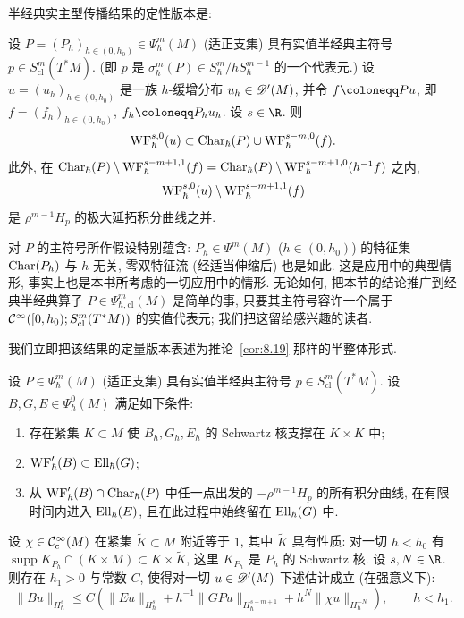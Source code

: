 半经典实主型传播结果的定性版本是:

\begin{theorem}[半经典波前集的传播]\label{thm:8.25}
设 $P = (P_h)_{h \in (0, h_0)} \in \Psi_\hbar^m(M)$ (适正支集) 具有实值半经典主符号 $p \in S_{\mathrm{cl}}^m(T^*M)$. (即 $p$ 是 $\sigma_\hbar^m(P) \in S_\hbar^m/hS_\hbar^{m-1}$ 的一个代表元.) 设 $u = (u_h)_{h \in (0, h_0)}$ 是一族 $h$-缓增分布 $u_h \in \mathscr{D}'(M)$, 并令 $f \defeq Pu$, 即 $f = (f_h)_{h \in (0, h_0)}$, $f_h \defeq P_h u_h$. 设 $s \in \R$. 则
\begin{equation}\label{eq:8.95}
    \operatorname{WF}_\hbar^{s,0}(u) \subset \operatorname{Char}_\hbar(P) \cup \operatorname{WF}_\hbar^{s-m,0}(f).
\end{equation}
此外, 在 $\operatorname{Char}_\hbar(P) \setminus \operatorname{WF}_\hbar^{s-m+1,1}(f) = \operatorname{Char}_\hbar(P) \setminus \operatorname{WF}_\hbar^{s-m+1,0}(h^{-1}f)$ 之内,
\begin{equation}\label{eq:8.96}
    \operatorname{WF}_\hbar^{s,0}(u) \setminus \operatorname{WF}_\hbar^{s-m+1,1}(f)
\end{equation}
是 $\rho^{m-1}H_p$ 的极大延拓积分曲线之并.
\end{theorem}

\begin{remark}[半经典主符号与 $h$ 无关]\label{rem:8.26}
对 $P$ 的主符号所作假设特别蕴含: $P_h \in \Psi^m(M)$ ($h \in (0, h_0)$) 的特征集 $\operatorname{Char}(P_h)$ 与 $h$ 无关, 零双特征流 (经适当伸缩后) 也是如此. 这是应用中的典型情形, 事实上也是本书所考虑的一切应用中的情形. 无论如何, 把本节的结论推广到经典半经典算子 $P \in \Psi_{\hbar, \mathrm{cl}}^m(M)$ 是简单的事, 只要其主符号容许一个属于 $\mathcal{C}^\infty([0, h_0); S_{\mathrm{cl}}^m(T^*M))$ 的实值代表元; 我们把这留给感兴趣的读者.
\end{remark}

我们立即把该结果的定量版本表述为推论~\ref{cor:8.19} 那样的半整体形式.

\begin{theorem}\label{thm:8.27}
设 $P \in \Psi_\hbar^m(M)$ (适正支集) 具有实值半经典主符号 $p \in S_{\mathrm{cl}}^m(T^*M)$. 设 $B, G, E \in \Psi_\hbar^0(M)$ 满足如下条件:
\begin{enumerate}
    \item 存在紧集 $K \subset M$ 使 $B_h, G_h, E_h$ 的 Schwartz 核支撑在 $K \times K$ 中;
    \item $\operatorname{WF}_\hbar'(B) \subset \operatorname{Ell}_\hbar(G)$;
    \item 从 $\operatorname{WF}_\hbar'(B) \cap \operatorname{Char}_\hbar(P)$ 中任一点出发的 $-\rho^{m-1}H_p$ 的所有积分曲线, 在有限时间内进入 $\operatorname{Ell}_\hbar(E)$, 且在此过程中始终留在 $\operatorname{Ell}_\hbar(G)$ 中.
\end{enumerate}
设 $\chi \in \mathcal{C}_{\mathrm{c}}^\infty(M)$ 在紧集 $\tilde{K} \subset M$ 附近等于 $1$, 其中 $\tilde{K}$ 具有性质: 对一切 $h < h_0$ 有 $\operatorname{supp}K_{P_h} \cap (K \times M) \subset K \times \tilde{K}$, 这里 $K_{P_h}$ 是 $P_h$ 的 Schwartz 核. 设 $s, N \in \R$. 则存在 $h_1 > 0$ 与常数 $C$, 使得对一切 $u \in \mathscr{D}'(M)$ 下述估计成立 (在强意义下):
\begin{equation}\label{eq:8.97}
    \| B u \|_{H_\hbar^s} \le C\left( \| E u \|_{H_\hbar^s} + h^{-1}\| G P u \|_{H_\hbar^{s-m+1}} + h^N \| \chi u \|_{H_\hbar^{-N}} \right), \qquad h < h_1.
\end{equation}
\end{theorem}


